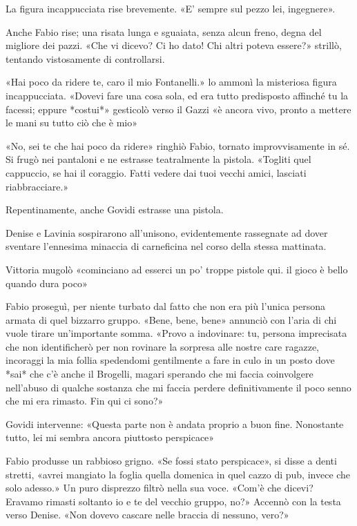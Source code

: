 La figura incappucciata rise brevemente. «E' sempre sul pezzo lei, ingegnere».

Anche Fabio rise; una risata lunga e sguaiata, senza alcun freno, degna del migliore dei pazzi. «Che vi dicevo? Ci ho dato! Chi altri poteva essere?» strillò, tentando vistosamente di controllarsi.

«Hai poco da ridere te, caro il mio Fontanelli.» lo ammonì la misteriosa figura incappucciata. «Dovevi fare una cosa sola, ed era tutto predisposto affinché tu la facessi; eppure *costui*» gesticolò verso il Gazzi «è ancora vivo, pronto a mettere le mani su tutto ciò che è mio»

«No, sei te che hai poco da ridere» ringhiò Fabio, tornato improvvisamente in sé. Si frugò nei pantaloni e ne estrasse teatralmente la pistola. «Togliti quel cappuccio, se hai il coraggio. Fatti vedere dai tuoi vecchi amici, lasciati riabbracciare.»

Repentinamente, anche Govidi estrasse una pistola.

Denise e Lavinia sospirarono all'unisono, evidentemente rassegnate ad dover sventare l'ennesima minaccia di carneficina nel corso della stessa mattinata. 

Vittoria mugolò «cominciano ad esserci un po' troppe pistole qui. il gioco è bello quando dura poco»

Fabio proseguì, per niente turbato dal fatto che non era più l'unica persona armata di quel bizzarro gruppo. «Bene, bene, bene» annunciò con l'aria di chi vuole tirare un'importante somma. «Provo a indovinare: tu, persona imprecisata che non identificherò per non rovinare la sorpresa alle nostre care ragazze, incoraggi la mia follia spedendomi gentilmente a fare in culo in un posto dove *sai* che c'è anche il Brogelli, magari sperando che mi faccia coinvolgere nell'abuso di qualche sostanza che mi faccia perdere definitivamente il poco senno che mi era rimasto. Fin qui ci sono?»

Govidi intervenne: «Questa parte non è andata proprio a buon fine. Nonostante tutto, lei mi sembra ancora piuttosto perspicace»

Fabio produsse un rabbioso grigno. «Se fossi stato perspicace», si disse a denti stretti, «avrei mangiato la foglia quella domenica in quel cazzo di pub, invece che solo adesso.» Un puro disprezzo filtrò nella sua voce. «Com'è che dicevi? Eravamo rimasti soltanto io e te del vecchio gruppo, no?» Accennò con la testa verso Denise. «Non dovevo cascare nelle braccia di nessuno, vero?»

